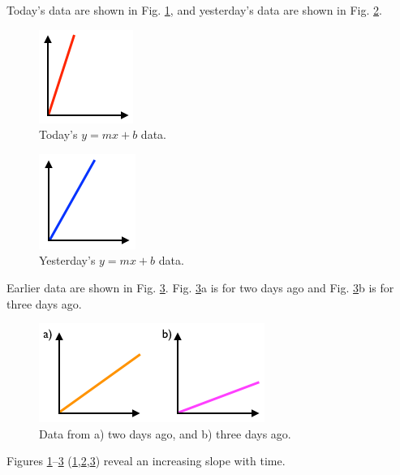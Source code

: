 Today's data are shown in Fig. \ref{fig:today}, and yesterday's data are
shown in Fig. \ref{fig:yesterday}.

\begin{figure}[htbp]
\centering
\includegraphics{img/today.png}
\caption{Today's \(y=mx+b\) data.\label{fig:today}}
\end{figure}

\begin{figure}[htbp]
\centering
\includegraphics{img/yesterday.png}
\caption{Yesterday's \(y=mx+b\) data.\label{fig:yesterday}}
\end{figure}

Earlier data are shown in Fig. \ref{fig:earlier}. Fig.
\ref{fig:earlier}a is for two days ago and Fig. \ref{fig:earlier}b is
for three days ago.

\begin{figure}[htbp]
\centering
\includegraphics{img/earlier.png}
\caption{Data from a) two days ago, and b) three days
ago.\label{fig:earlier}}
\end{figure}

Figures \ref{fig:today}--\ref{fig:earlier}
(\ref{fig:today},\ref{fig:yesterday},\ref{fig:earlier}) reveal an
increasing slope with time.
